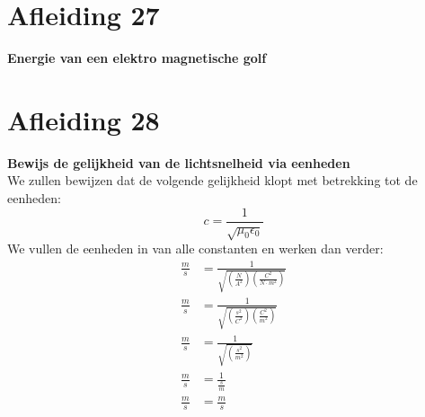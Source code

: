 \documentclass[a4paper,kul]{kulakarticle} %
\begin{document}
\section{Afleiding 27}
\textbf{Energie van een elektro magnetische golf}\\

\newpage
\section{Afleiding 28}
\textbf{Bewijs de gelijkheid van de lichtsnelheid via eenheden}\\
We zullen bewijzen dat de volgende gelijkheid klopt met betrekking tot de eenheden:
\begin{equation*}
	c = \frac{1}{\sqrt{\mu_0\epsilon_0}}
\end{equation*}
We vullen de eenheden in van alle constanten en werken dan verder:
\begin{align*}
	\frac{m}{s} &= \frac{1}{\sqrt{(\frac{N}{A^2})(\frac{C^2}{N\cdot m^2})}}\\
	\frac{m}{s} &= \frac{1}{\sqrt{(\frac{s^2}{C^2})(\frac{C^2}{ m^2})}}\\
	\frac{m}{s} &= \frac{1}{\sqrt{(\frac{s^2}{m^2})}}\\
	\frac{m}{s} &= \frac{1}{\frac{s}{m}}\\
	\frac{m}{s} &= \frac{m}{s}	
\end{align*}
\newpage
\end{document}
